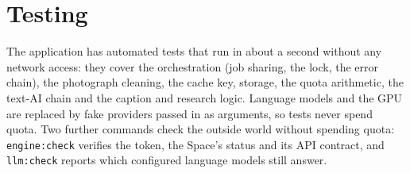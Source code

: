 \section{Testing}

The application has \vTestsApp{} automated tests that run in about a second without any network access: they cover the orchestration (job sharing, the lock, the error chain), the photograph cleaning, the cache key, storage, the quota arithmetic, the text-AI chain and the caption and research logic. Language models and the GPU are replaced by fake providers passed in as arguments, so tests never spend quota. Two further commands check the outside world without spending quota: \texttt{engine:check} verifies the token, the Space's status and its API contract, and \texttt{llm:check} reports which configured language models still answer.
